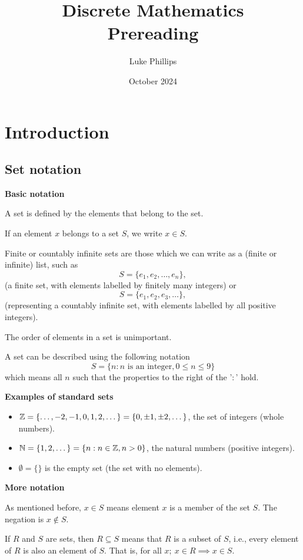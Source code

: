\documentclass[10pt, a4paper]{article}
\title{Discrete Mathematics \\
    \large Prereading}
\author{Luke Phillips}
\date{October 2024}
\begin{document}
\maketitle

\newpage

\section{Introduction}

\subsection{Set notation}
\textbf{Basic notation}

A set is defined by the elements that belong to the set.

If an element $x$ belongs to a set $S$, we write $x \in S$.

Finite or countably infinite sets are those which we can write as a (finite or infinite) list, such as
\[
S = \{e_1, e_2, \dots, e_n\},
\]
(a finite set, with elements labelled by finitely many integers) or
\[
S = \{e_1, e_2, e_3, \dots\},
\]
(representing a countably infinite set, with elements labelled by all positive integers).

The order of elements in a set is unimportant.

A set can be described using the following notation
\[
S = \{n: n \text{ is an integer}, 0\leq n \leq 9\}
\]
which means all $n$ such that the properties to the right of the '$:$' hold.

\textbf{Examples of standard sets}
\begin{itemize}
    \item $\mathbb{Z} = \{\dots, -2, -1, 0, 1, 2, \dots\} = \{0, \pm1, \pm2, \dots\}$, the set of integers (whole numbers).
    \item $\mathbb{N} = \{1, 2, \dots\} = \{n: n\in\mathbb{Z}, n>0\}$, the natural numbers (positive integers).
    \item $\emptyset = \{\}$ is the empty set (the set with no elements).
\end{itemize}

\textbf{More notation}

As mentioned before, $x \in S$ means element $x$ is a member of the set $S$. The negation is $x \notin S$.

If $R$ and $S$ are sets, then $R \subseteq S$ means that $R$ is a subset of $S$, i.e., every element of $R$ is also an element of $S$. That is, for all $x;\ x \in R \implies x \in S$.
\end{document}
